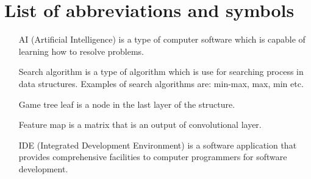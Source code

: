 \chapter{List of abbreviations and symbols}

\begin{itemize}
    \item[AI] (Artificial Intelligence) is a type of computer software which is capable of learning how to resolve problems.
    \item[Search algorithm] is a type of algorithm which is use for searching process in data structures. Examples of search algorithms are: min-max, max, min etc.
    \item[Game tree leaf] is a node in the last layer of the structure.
    \item[Feature map] is a matrix that is an output of convolutional layer. 
    \item[IDE] (Integrated Development Environment) is a software application that provides comprehensive facilities to computer programmers for software development.
\end{itemize}
